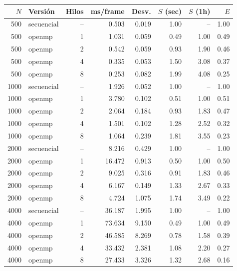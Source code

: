 \begin{tabular}{rlrrrrrr}
\toprule
$N$ & Versión & Hilos & ms/frame & Desv. & $S$ (sec) & $S$ (1h) & $E$ \\
\midrule
500 & secuencial & -- & 0.503 & 0.019 & 1.00 & -- & 1.00 \\
500 & openmp & 1 & 1.031 & 0.059 & 0.49 & 1.00 & 0.49 \\
500 & openmp & 2 & 0.542 & 0.059 & 0.93 & 1.90 & 0.46 \\
500 & openmp & 4 & 0.335 & 0.053 & 1.50 & 3.08 & 0.37 \\
500 & openmp & 8 & 0.253 & 0.082 & 1.99 & 4.08 & 0.25 \\
\midrule
1000 & secuencial & -- & 1.926 & 0.052 & 1.00 & -- & 1.00 \\
1000 & openmp & 1 & 3.780 & 0.102 & 0.51 & 1.00 & 0.51 \\
1000 & openmp & 2 & 2.064 & 0.184 & 0.93 & 1.83 & 0.47 \\
1000 & openmp & 4 & 1.501 & 0.102 & 1.28 & 2.52 & 0.32 \\
1000 & openmp & 8 & 1.064 & 0.239 & 1.81 & 3.55 & 0.23 \\
\midrule
2000 & secuencial & -- & 8.216 & 0.429 & 1.00 & -- & 1.00 \\
2000 & openmp & 1 & 16.472 & 0.913 & 0.50 & 1.00 & 0.50 \\
2000 & openmp & 2 & 9.025 & 0.316 & 0.91 & 1.83 & 0.46 \\
2000 & openmp & 4 & 6.167 & 0.149 & 1.33 & 2.67 & 0.33 \\
2000 & openmp & 8 & 4.724 & 1.075 & 1.74 & 3.49 & 0.22 \\
\midrule
4000 & secuencial & -- & 36.187 & 1.995 & 1.00 & -- & 1.00 \\
4000 & openmp & 1 & 73.634 & 9.150 & 0.49 & 1.00 & 0.49 \\
4000 & openmp & 2 & 46.585 & 8.269 & 0.78 & 1.58 & 0.39 \\
4000 & openmp & 4 & 33.432 & 2.381 & 1.08 & 2.20 & 0.27 \\
4000 & openmp & 8 & 27.433 & 3.326 & 1.32 & 2.68 & 0.16 \\
\bottomrule
\end{tabular}
